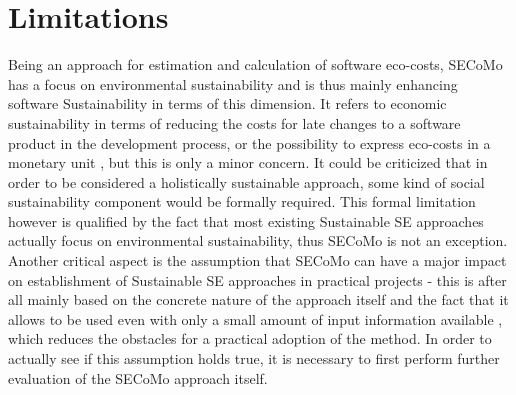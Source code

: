 \documentclass[oribibl]{llncs}
\begin{document}
\section{Limitations} %
Being an approach for estimation and calculation of software eco-costs, SECoMo has a focus on environmental sustainability and is thus mainly enhancing software Sustainability in terms of this dimension. It refers to economic sustainability in terms of reducing the costs for late changes to a software product in the development process, or the possibility to express eco-costs in a monetary unit \cite{schulze_cost_2016}, but this is only a minor concern. It could be criticized that in order to be considered a holistically sustainable approach, some kind of social sustainability component would be formally required. %
This formal limitation however is qualified %
by the fact that most existing Sustainable SE approaches actually focus on environmental sustainability, thus SECoMo is not an exception.\\
Another critical aspect is the assumption that SECoMo can have a major impact on establishment of Sustainable SE approaches in practical projects - this is after all mainly based on the concrete nature of the approach itself and the fact that it allows to be used even with only a small amount of input information available \cite{schulze_cost_2016}, which reduces the obstacles for a practical adoption of the method. In order to actually see if this assumption holds true, it is necessary to first perform further evaluation of the SECoMo approach itself.
\end{document}
